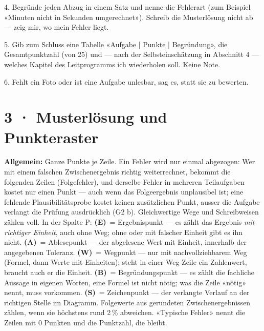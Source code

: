 \documentclass[11pt]{article}
\begin{document}
\begin{tcolorbox}[breakable,colback=lplinie!25,colframe=lplinie,boxrule=0.5pt,arc=1mm,fontupper=\small]
4. Begründe jeden Abzug in einem Satz und nenne die Fehlerart (zum Beispiel «Minuten nicht in Sekunden umgerechnet»). Schreib die Musterlösung nicht ab — zeig mir, wo mein Fehler liegt.\par
5. Gib zum Schluss eine Tabelle «Aufgabe | Punkte | Begründung», die Gesamtpunktzahl (von 25) und — nach der Selbsteinschätzung in Abschnitt 4 — welches Kapitel des Leitprogramms ich wiederholen soll. Keine Note.\par
6. Fehlt ein Foto oder ist eine Aufgabe unlesbar, sag es, statt sie zu bewerten.
\end{tcolorbox}

\section*{3 · Musterlösung und Punkteraster}
\textbf{Allgemein:} Ganze Punkte je Zeile. Ein Fehler wird nur einmal abgezogen: Wer mit einem falschen Zwischenergebnis
richtig weiterrechnet, bekommt die folgenden Zeilen (Folgefehler), und derselbe Fehler in mehreren Teilaufgaben kostet nur einen Punkt — auch wenn das Folgeergebnis unplausibel ist; eine fehlende
Plausibilitätsprobe kostet keinen zusätzlichen Punkt, ausser die Aufgabe verlangt die Prüfung ausdrücklich (G2 b). Gleichwertige Wege und Schreibweisen zählen voll.
In der Spalte P: \textbf{(E)}~= Ergebnispunkt — es zählt das Ergebnis \emph{mit richtiger Einheit}, auch ohne Weg; ohne oder mit
falscher Einheit gibt es ihn nicht. \textbf{(A)}~= Ablesepunkt — der abgelesene Wert mit Einheit, innerhalb der angegebenen Toleranz. \textbf{(W)}~= Wegpunkt — nur mit nachvollziehbarem Weg (Formel, dann Werte mit Einheiten);
steht in einer Weg-Zeile ein Zahlenwert, braucht auch er die Einheit. \textbf{(B)}~= Begründungspunkt — es zählt die fachliche
Aussage in eigenen Worten, eine Formel ist nicht nötig; was die Zeile «nötig» nennt, muss vorkommen. \textbf{(S)}~= Zeichenpunkt — der verlangte Verlauf an der richtigen Stelle im Diagramm.
Folgewerte aus gerundeten Zwischenergebnissen zählen, wenn sie höchstens rund 2\,\% abweichen.
«Typische Fehler» nennt die Zeilen mit 0 Punkten und die Punktzahl, die bleibt.
\end{document}

